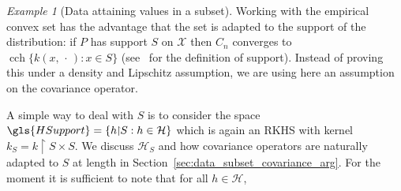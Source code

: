 \documentclass[AHL,Unicode,longabstracts,published]{cedram}
\theoremstyle{remark}
\newtheorem{examl}{Example}
\DeclareMathOperator{\cch}{cch}
\newcommand{\restrr}
{\!\!\upharpoonright\!\!}
\newcommand{\X}{\mathcal{X}}
\newcommand{\cH}{\mathcal{H}}
\begin{document}
\begin{examl}[{Data attaining values in a subset}] \label{sec:example_subset}
Working with the empirical convex set has the advantage that the set is adapted to the support of the distribution: if $P$ has support $S$ on $\X$ then $C_n$ converges to $\cch \{k(x,\,\cdot\,) : x \in S \}$ (see~\cite[Definition~411N]{FREM} for the definition of support). Instead of proving this under a density and Lipschitz assumption, we are using here an assumption on the covariance operator.

A simple way to deal with $S$ is to consider the space $\gls{HSupport} = \{ h\restrr S : h \in \cH \}$ which is again an RKHS with kernel $k_S = k\restrr S \times S$. We discuss $\cH_S$ and how covariance operators are naturally adapted to $S$ at length in Section~\ref{sec:data_subset_covariance_arg}. For the moment it is sufficient to note that for all $h\in \cH$,


\end{examl}
\end{document}
